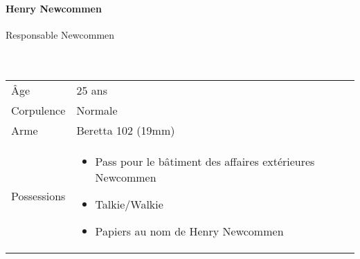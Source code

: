 \documentclass[10pt,a4paper,twocolumn]{article}
\begin{document}
\hypertarget{henry}{\paragraph{Henry Newcommen}}Responsable Newcommen\\ \\
\
\begin{tabular}{l|p{}}
	Âge & 25 ans\\
	Corpulence & Normale \\
	Arme & Beretta 102 (19mm) \\
	Possessions & \begin{itemize}
	\item Pass pour le bâtiment des affaires extérieures Newcommen
	\item Talkie/Walkie
	\item Papiers au nom de Henry Newcommen
\end{itemize}	 \\
\end{tabular}
\end{document}
